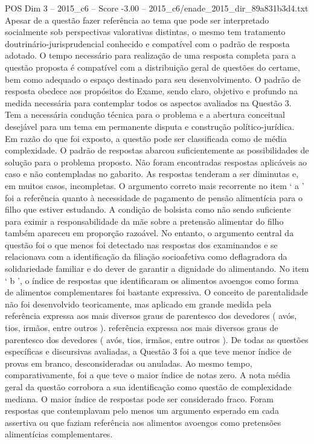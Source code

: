\begin{textsample}{POS Dim 3 – 2015\_c6 – Score -3.00 – 2015\_c6/enade\_2015\_dir\_89a831b3d4.txt}
Apesar de a questão fazer referência ao tema que pode ser interpretado socialmente sob perspectivas valorativas distintas, o mesmo tem tratamento doutrinário-jurisprudencial conhecido e compatível com o padrão de resposta adotado.
O tempo necessário para realização de uma resposta completa para a questão proposta é compatível com a distribuição geral de questões do certame, bem como adequado o espaço destinado para seu desenvolvimento.
O padrão de resposta obedece aos propósitos do Exame, sendo claro, objetivo e profundo na medida necessária para contemplar todos os aspectos avaliados na Questão 3.
Tem a necessária condução técnica para o problema e a abertura conceitual desejável para um tema em permanente disputa e construção político-jurídica.
Em razão do que foi exposto, a questão pode ser classificada como de média complexidade.
O padrão de respostas abarcou suficientemente as possibilidades de solução para o problema proposto.
Não foram encontradas respostas aplicáveis ao caso e não contempladas no gabarito.
As respostas tenderam a ser diminutas e, em muitos casos, incompletas.
O argumento correto mais recorrente no item ‘ a ’ foi a referência quanto à necessidade de pagamento de pensão alimentícia para o filho que estiver estudando.
A condição de bolsista como não sendo suficiente para eximir a responsabilidade da mãe sobre a pretensão alimentar do filho também apareceu em proporção razoável.
No entanto, o argumento central da questão foi o que menos foi detectado nas respostas dos examinandos e se relacionava com a identificação da filiação socioafetiva como deflagradora da solidariedade familiar e do dever de garantir a dignidade do alimentando.
No item ‘ b ’, o índice de respostas que identificaram os alimentos avoengos como forma de alimentos complementares foi bastante expressiva.
O conceito de parentalidade não foi desenvolvido teoricamente, mas aplicado em grande medida pela referência expressa aos mais diversos graus de parentesco dos devedores ( avós, tios, irmãos, entre outros ). referência expressa aos mais diversos graus de parentesco dos devedores ( avós, tios, irmãos, entre outros ).
De todas as questões específicas e discursivas avaliadas, a Questão 3 foi a que teve menor índice de provas em branco, desconsideradas ou anuladas.
Ao mesmo tempo, comparativamente, foi a que teve o maior índice de notas zero.
A nota média geral da questão corrobora a sua identificação como questão de complexidade mediana.
O maior índice de respostas pode ser considerado fraco.
Foram respostas que contemplavam pelo menos um argumento esperado em cada assertiva ou que faziam referência aos alimentos avoengos como pretensões alimentícias complementares.

\end{textsample}

